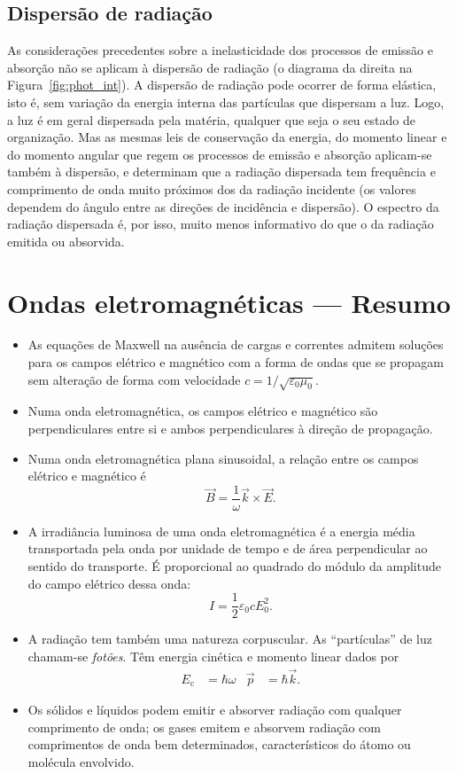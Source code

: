 \subsection{Dispersão de radiação}
As considerações precedentes sobre a inelasticidade dos processos de emissão e
absorção não se aplicam à dispersão de radiação (o diagrama da direita na
Figura~\ref{fig:phot_int}). A dispersão de radiação pode ocorrer de forma
elástica, isto é, sem variação da energia interna das partículas que dispersam a
luz. Logo, a luz é em geral dispersada pela matéria, qualquer que seja
o seu estado de organização. Mas as mesmas leis de conservação da energia, do
momento linear e do momento angular que regem os processos de emissão e
absorção aplicam-se também à dispersão, e determinam que a radiação dispersada
tem frequência e comprimento de onda muito próximos dos da radiação incidente
(os valores dependem do ângulo entre as direções de incidência e dispersão). O
espectro da radiação dispersada é, por isso, muito menos informativo do que o da
radiação emitida ou absorvida.


\newpage
\section*{Ondas eletromagnéticas --- Resumo}
\begin{itemize}
\item
    As equações de Maxwell na ausência de cargas e correntes admitem soluções
    para os campos elétrico e magnético com a forma de ondas que se propagam sem
    alteração de forma com velocidade $c=1/\sqrt{\varepsilon_0\mu_0}$.
\item
    Numa onda eletromagnética, os campos elétrico e magnético são
    perpendiculares entre si e ambos perpendiculares à direção de propagação.
\item
    Numa onda eletromagnética plana sinusoidal, a relação entre os campos
    elétrico e magnético é
    \begin{equation*}
    \vec B=\frac{1}{\omega}\vec k\times\vec E.
    \end{equation*}
\item
    A irradiância luminosa de uma onda eletromagnética é a energia média
    transportada pela onda por unidade de tempo e de área perpendicular ao
    sentido do transporte. É proporcional ao quadrado do módulo da amplitude do
    campo elétrico dessa onda:
    \begin{equation*}
    I=\frac{1}{2}\varepsilon_0cE_0^2.
    \end{equation*}
\item
    A radiação tem também uma natureza corpuscular. As ``partículas'' de luz
    chamam-se \emph{fotões}. Têm energia cinética e momento linear dados por
    \begin{align*}
    E_\text{c}&=\hbar\omega&\vec p&=\hbar \vec k.
    \end{align*}
\item
    Os sólidos e líquidos podem emitir e absorver radiação com qualquer
    comprimento de onda; os gases emitem e absorvem radiação com comprimentos de
    onda bem determinados, característicos do átomo ou molécula envolvido.
\end{itemize}
